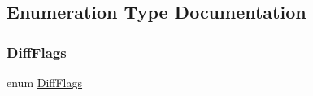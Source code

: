 \subsection{Enumeration Type Documentation}
\mbox{\label{namespacesgl_1_1priv_1_1diff_ab3b1c38517a62ce7edefba7b93b406dd}} 
\subsubsection{\texorpdfstring{Diff\+Flags}{DiffFlags}}
{\footnotesize\ttfamily enum \mbox{\hyperlink{namespacesgl_1_1priv_1_1diff_ab3b1c38517a62ce7edefba7b93b406dd}{Diff\+Flags}}}

